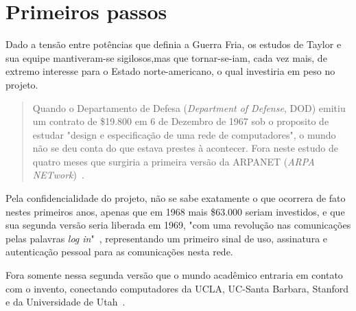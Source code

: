 \documentclass[conference]{IEEEtran}
\begin{document}
\section{Primeiros passos}
Dado a tensão entre potências que definia a Guerra Fria, os estudos de Taylor e sua equipe mantiveram-se sigilosos,mas que tornar-se-iam, cada vez mais, de extremo interesse para o Estado norte-americano, o qual investiria em peso no projeto.
  \begin{quote}
    Quando o Departamento de Defesa (\emph{Department of Defense}, DOD) emitiu um contrato de \$19.800 em
    6 de Dezembro de 1967 sob o proposito de estudar "design e especificação de uma
    rede de computadores", o mundo não se deu conta do que estava prestes à
    acontecer. Fora neste estudo de quatro meses que surgiria a primeira versão
    da ARPANET (\emph{ARPA NETwork})~\cite{internethistory}. 
  \end{quote}

  Pela confidencialidade do projeto, não se sabe exatamente o que ocorrera de
  fato nestes primeiros anos, apenas que em 1968 mais \$63.000 seriam investidos, e que sua segunda versão seria liberada em 1969,
   "com uma revolução nas comunicações pelas palavras
    \emph{log in}"~\cite{fromarpanet}, representando um primeiro sinal de uso, assinatura e autenticação pessoal para as comunicações nesta rede.
	
	

  Fora somente nessa segunda versão que o mundo acadêmico entraria em contato
  com o invento, conectando computadores da UCLA, UC-Santa Barbara, Stanford e
  da Universidade de Utah~\cite{fromarpanet}.
\end{document}

